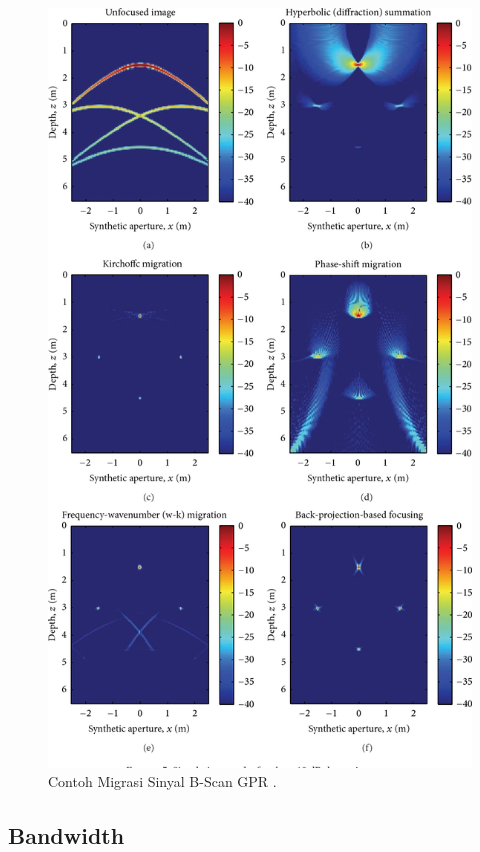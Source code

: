 \begin{figure}[ht]
  \centering
  \includegraphics[scale=0.27]{gambar/migrasi.png}
  \caption{Contoh Migrasi Sinyal B-Scan GPR \parencite{Ozdemir2014ARO}.}
  \label{fig:migrasiGPR}
\end{figure}

\subsection{Bandwidth}
\label{subsec:bandwidth}

